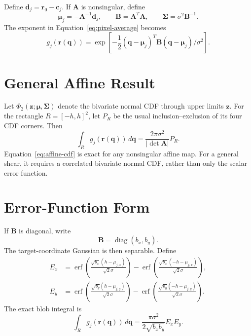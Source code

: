 \documentclass[11pt,a4paper]{article}
\begin{document}
Define $\mathbf{d}_j=\mathbf{r}_0-\mathbf{c}_j$.  If $\mathbf{A}$ is
nonsingular, define
\begin{equation}
 \boldsymbol{\mu}_j=-\mathbf{A}^{-1}\mathbf{d}_j,
 \qquad
 \mathbf{B}=\mathbf{A}^T\mathbf{A},
 \qquad
 \boldsymbol{\Sigma}=\sigma^2\mathbf{B}^{-1}.
\end{equation}
The exponent in Equation~\eqref{eq:pixel-average} becomes
\begin{equation}
 g_j\left(\mathbf{r}(\mathbf{q})\right)=
 \exp\left[-\frac{1}{2}
 (\mathbf{q}-\boldsymbol{\mu}_j)^T
 \mathbf{B}(\mathbf{q}-\boldsymbol{\mu}_j)/\sigma^2\right].
 \label{eq:target-gaussian}
\end{equation}

\section{General Affine Result}

Let $\Phi_2(\mathbf{z};\boldsymbol{\mu},\boldsymbol{\Sigma})$ denote the
bivariate normal CDF through upper limits $\mathbf{z}$.  For the rectangle
$R=[-h,h]^2$, let $P_R$ be the usual inclusion--exclusion of its four CDF
corners.  Then
\begin{equation}
 \int_R g_j\left(\mathbf{r}(\mathbf{q})\right)\,d\mathbf{q}
 = \frac{2\pi\sigma^2}{\left|\det\mathbf{A}\right|}P_R.
 \label{eq:affine-cdf}
\end{equation}
Equation~\eqref{eq:affine-cdf} is exact for any nonsingular affine map.
For a general shear, it requires a correlated bivariate normal CDF, rather
than only the scalar error function.

\section{Error-Function Form}

If $\mathbf{B}$ is diagonal, write
\begin{equation}
 \mathbf{B}=\operatorname{diag}(b_x,b_y).
\end{equation}
The target-coordinate Gaussian is then separable.  Define
\begin{align}
 E_x &= \operatorname{erf}\left(
 \frac{\sqrt{b_x}(h-\mu_{j,x})}{\sqrt{2}\sigma}
 \right)-\operatorname{erf}\left(
 \frac{\sqrt{b_x}(-h-\mu_{j,x})}{\sqrt{2}\sigma}
 \right), \\
 E_y &= \operatorname{erf}\left(
 \frac{\sqrt{b_y}(h-\mu_{j,y})}{\sqrt{2}\sigma}
 \right)-\operatorname{erf}\left(
 \frac{\sqrt{b_y}(-h-\mu_{j,y})}{\sqrt{2}\sigma}
 \right).
\end{align}
The exact blob integral is
\begin{equation}
 \int_R g_j\left(\mathbf{r}(\mathbf{q})\right)\,d\mathbf{q}
 = \frac{\pi\sigma^2}{2\sqrt{b_xb_y}} E_xE_y.
 \label{eq:erf-result}
\end{equation}
\end{document}
